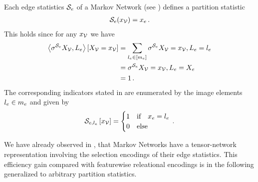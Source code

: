 \begin{example}
    Each edge statistics $\mathcal{S}_{e}$ of a Markov Network (see ) defines a partition statistic
    \begin{align*}
        \mathcal{S}_{e}(x_{\mathcal{V}}) = x_{e} \, .
    \end{align*}
    This holds since for any $x_{\mathcal{V}}$ we have
    \begin{align*}
        \left\langle \sigma^{\mathcal{S}_{e}}{X_{\mathcal{V}},L_{e}}\right\rangle \left[ X_{\mathcal{V}}=x_{\mathcal{V}} \right]
        &= \sum_{l_{e}\in[m_{e}]} \sigma^{\mathcal{S}_{e}}{X_{\mathcal{V}}=x_{\mathcal{V}},L_{e}=l_{e}} \\
        &= \sigma^{\mathcal{S}_{e}}{X_{\mathcal{V}}=x_{\mathcal{V}},L_{e}=X_{e}} \\
        &= 1 \, .
    \end{align*}
    The corresponding indicators stated in  are enumerated by the image elements $l_{e}\in m_{e}$ and given by
    \begin{align*}
        \mathcal{S}_{e,l_{e}}\left[x_{\mathcal{V}}\right]
        = \begin{cases}
              1 & \text{if} \quad x_{e} = l_{e} \\
              0 & \text{else}
        \end{cases} \, .
    \end{align*}
\end{example}

We have already observed in , that Markov Networks have a tensor-network representation involving the selection encodings of their edge statistics.
This efficiency gain compared with featurewise releational encodings is in the following generalized to arbitrary partition statistics.

